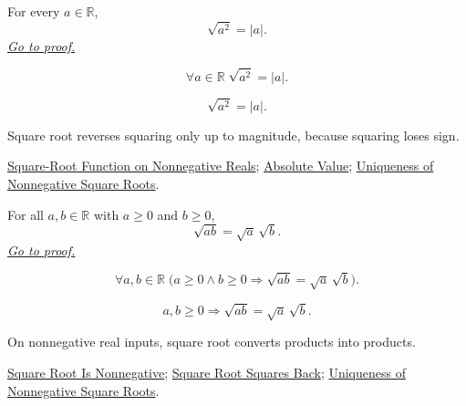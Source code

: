 \begin{theorem}
\label{thm:sqrt-of-square-absolute-value}
For every $a\in\mathbb{R}$,
\[
\sqrt{a^2}=|a|.
\]
\hyperref[prf:sqrt-of-square-absolute-value]{\textit{Go to proof.}}
\end{theorem}
\begin{remark*}
\[
\forall a\in\mathbb{R}\;\sqrt{a^2}=|a|.
\]
\end{remark*}
\begin{remark*}
\[
\sqrt{a^2}=|a|.
\]
\end{remark*}
\begin{remark*}[Interpretation]
Square root reverses squaring only up to magnitude, because squaring loses
sign.
\end{remark*}
\begin{dependencies}
\hyperref[def:real-square-root-function]{Square-Root Function on Nonnegative Reals};
\hyperref[def:absolute-value]{Absolute Value};
\hyperref[thm:uniqueness-of-nonnegative-square-roots]{Uniqueness of Nonnegative Square Roots}.
\end{dependencies}

\begin{theorem}
\label{thm:sqrt-product}
For all $a,b\in\mathbb{R}$ with $a\ge0$ and $b\ge0$,
\[
\sqrt{ab}=\sqrt a\,\sqrt b.
\]
\hyperref[prf:sqrt-product]{\textit{Go to proof.}}
\end{theorem}
\begin{remark*}
\[
\forall a,b\in\mathbb{R}\;
\bigl(a\ge0\land b\ge0\Rightarrow \sqrt{ab}=\sqrt a\,\sqrt b\bigr).
\]
\end{remark*}
\begin{remark*}
\[
a,b\ge0\Rightarrow \sqrt{ab}=\sqrt a\,\sqrt b.
\]
\end{remark*}
\begin{remark*}[Interpretation]
On nonnegative real inputs, square root converts products into products.
\end{remark*}
\begin{dependencies}
\hyperref[thm:sqrt-nonnegative]{Square Root Is Nonnegative};
\hyperref[thm:sqrt-square]{Square Root Squares Back};
\hyperref[thm:uniqueness-of-nonnegative-square-roots]{Uniqueness of Nonnegative Square Roots}.
\end{dependencies}

